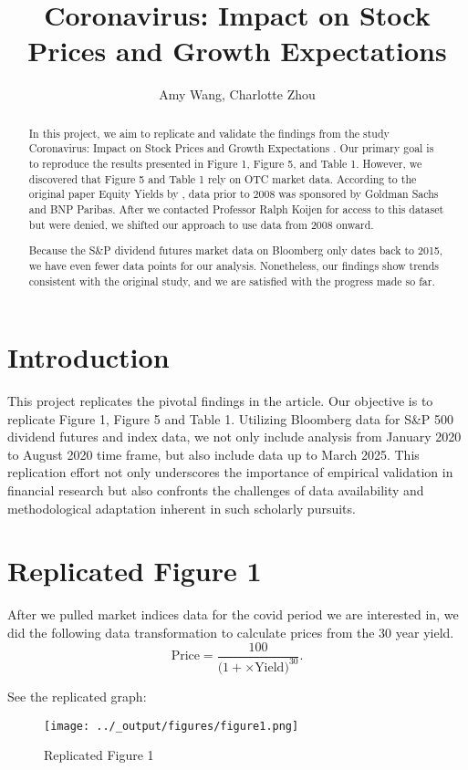 \documentclass{article}
\title{Coronavirus: Impact on Stock Prices and Growth Expectations}
\author{Amy Wang, Charlotte Zhou}
\begin{document}
\maketitle
\begin{abstract}
  In this project, we aim to replicate and validate the findings from the study Coronavirus: Impact on Stock Prices and Growth Expectations \cite{gormsen2020coronavirus}.
   Our primary goal is to reproduce the results presented in Figure 1, Figure 5, and Table 1. However, we discovered that Figure 5 and Table 1 rely on OTC market data. 
   According to the original paper Equity Yields by \cite{van2013equity}, data prior to 2008 was sponsored by Goldman Sachs and BNP Paribas. After we contacted Professor Ralph Koijen for access to this dataset but were denied,
    we shifted our approach to use data from 2008 onward.

  Because the S\&P dividend futures market data on Bloomberg only dates back to 2015, we have even 
  fewer data points for our analysis. Nonetheless, our findings show trends consistent with the original study, and we are satisfied with the progress made so far.
  \end{abstract}


\section{Introduction}
This project replicates the pivotal findings in the article. Our 
objective is to replicate Figure 1, Figure 5 and Table 1. Utilizing Bloomberg 
data for S\&P 500 dividend futures and index data, we not only include analysis from January 2020 to August 
2020 time frame, but also include data up to March 2025. This 
replication effort not only underscores the importance of empirical 
validation in financial research but also confronts the challenges 
of data availability and methodological adaptation inherent in such 
scholarly pursuits.
\section{Replicated Figure 1}

After we pulled market indices data for the covid period we are interested in, we did the following
data transformation to calculate prices from the 30 year yield. 
\[
\text{Price} 
= \frac{100}
  {\bigl(1 + \times \text{Yield}\bigr)^{30}}.
\]

See the replicated graph: 

\begin{figure}[H]
  \centering
  \texttt{[image: ../\_output/figures/figure1.png]} 
  \caption{Replicated Figure 1}
  \label{fig:example_image}
\end{figure}
\end{document}
